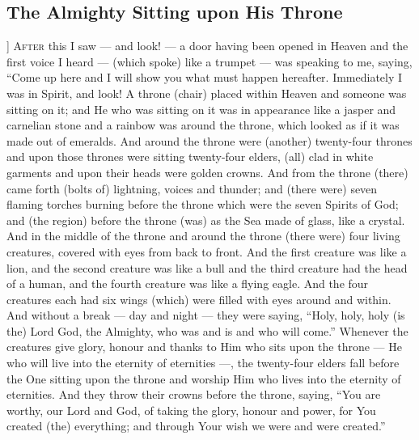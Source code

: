 \begin{pages}
\begin{Leftside}
        			\chapter{The Almighty Sitting upon His Throne}
				]
		\renewcommand{\LettrineFontHook}{\Zallmanfamily}
		\lettrine[lines=3]{A}{fter} this I saw — and look! — a door having been opened in Heaven and the first voice I heard — (which spoke) like a trumpet — was speaking to me, saying, “Come up here and I will show you what must happen hereafter. Immediately I was in Spirit, and look! A throne (chair) placed within Heaven and someone was sitting on it; and He who was sitting on it was in appearance like a jasper and carnelian stone and a rainbow was around the throne, which looked as if it was made out of emeralds. And around the throne were (another) twenty-four thrones and upon those thrones were sitting twenty-four elders, (all) clad in white garments and upon their heads were golden crowns. And from the throne (there) came forth (bolts of) lightning, voices and thunder; and (there were) seven flaming torches burning before the throne which were the seven Spirits of God; and (the region) before the throne (was) as the Sea made of glass, like a crystal.
		\pend
		\pstart
		And in the middle of the throne and around the throne (there were) four living creatures, covered with eyes from back to front. And the first creature was like a lion, and the second creature was like a bull and the third creature had the head of a human, and the fourth creature was like a flying eagle. And the four creatures each had six wings (which) were filled with eyes around and within. And without a break — day and night — they were saying, “Holy, holy, holy (is the) Lord God, the Almighty, who was and is and who will come.”
		\pend
		\pstart
		Whenever the creatures give glory, honour and thanks to Him who sits upon the throne — He who will live into the eternity of eternities —, the twenty-four elders fall before the One sitting upon the throne and worship Him who lives into the eternity of eternities. And they throw their crowns before the throne, saying, “You are worthy, our Lord and God, of taking the glory, honour and power, for You created (the) everything; and through Your wish we were and were created.”
		\pend
        \endnumbering
    \end{Leftside}

\end{pages} 
\Pages

